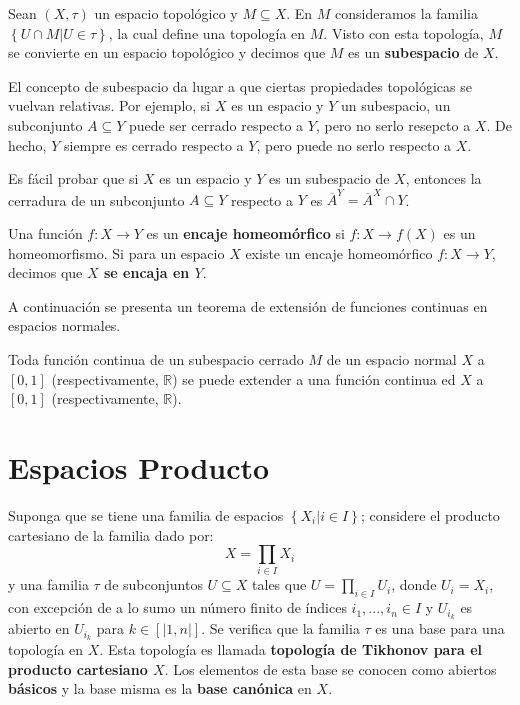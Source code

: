 \documentclass[12pt]{report}
\theoremstyle{largebreak}
\newcommand{\cf}[3]{\ensuremath{#1:#2\rightarrow#3}}
\newcommand{\natint}[1]{\ensuremath{\left[\big|#1\big|\right]}}
\begin{document}
    \begin{mydef}
        Sean $(X,\tau)$ un espacio topológico y $M\subseteq X$. En $M$ consideramos la familia $\left\{U\cap M|U\in\tau \right\}$, la cual define una topología en $M$. Visto con esta topología, $M$ se convierte en un espacio topológico y decimos que $M$ es un \textbf{subespacio} de $X$.
    \end{mydef}

    El concepto de subespacio da lugar a que ciertas propiedades topológicas se vuelvan relativas. Por ejemplo, si $X$ es un espacio y $Y$ un subespacio, un subconjunto $A\subseteq Y$ puede ser cerrado respecto a $Y$, pero no serlo resepcto a $X$. De hecho, $Y$ siempre es cerrado respecto a $Y$, pero puede no serlo respecto a $X$.

    Es fácil probar que si $X$ es un espacio y $Y$ es un subespacio de $X$, entonces la cerradura de un subconjunto $A\subseteq Y$ respecto a $Y$ es $\overline{A}^{Y}=\overline{A}^X\cap Y$.

    \begin{mydef}
        Una función $\cf{f}{X}{Y}$ es un \textbf{encaje homeomórfico} si $\cf{f}{X}{f(X)}$ es un homeomorfismo. Si para un espacio $X$ existe un encaje homeomórfico $\cf{f}{X}{Y}$, decimos que \textbf{$X$ se encaja en $Y$}.
    \end{mydef}

    A continuación se presenta un teorema de extensión de funciones continuas en espacios normales.

    \begin{theor}
        Toda función continua de un subespacio cerrado $M$ de un espacio normal $X$ a $[0,1]$ (respectivamente, $\mathbb{R}$) se puede extender a una función continua ed $X$ a $[0,1]$ (respectivamente, $\mathbb{R}$).
    \end{theor}

    \section{Espacios Producto}

    Suponga que se tiene una familia de espacios $\left\{X_i|i\in I \right\}$; considere el producto cartesiano de la familia dado por:
    \begin{equation*}
        X=\prod_{i\in I}X_i
    \end{equation*}
    y una familia $\tau$ de subconjuntos $U\subseteq X$ tales que $U=\prod_{i\in I}U_i$, donde $U_i= X_i$, con excepción de a lo sumo un número finito de índices $i_1,...,i_n\in I$ y $U_{i_k}$ es abierto en $U_{i_k}$ para $k\in\natint{1,n}$. Se verifica que la familia $\tau$ es una base para una topología en $X$. Esta topología es llamada \textbf{topología de Tikhonov para el producto cartesiano $X$}. Los elementos de esta base se conocen como abiertos \textbf{básicos} y la base misma es la \textbf{base canónica} en $X$.
\end{document}
